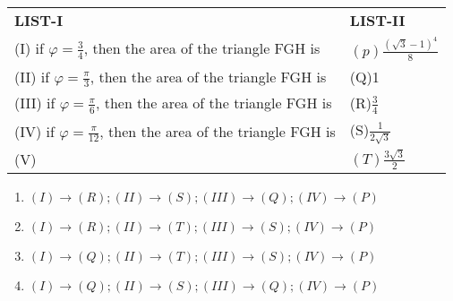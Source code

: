 \documentclass{article}
\begin{document}
\begin{enumerate}
\begin{center}                                        \begin{tabular}{l l}                                       \textbf{LIST-I} & \textbf{LIST-II} \\            (I) if $\varphi=\frac{3}{4}$, then the area of the triangle FGH is & $(p)\frac{(\sqrt{3}-1)^4}{8}$\\        (II) if $\varphi=\frac{\pi}{3}$, then the area of the triangle FGH is & (Q)1\\                              (III) if $\varphi =\frac{\pi}{6}$, then the area of the triangle FGH is & (R)$\frac{3}{4}$\\                (IV) if $\varphi =\frac{\pi}{12}$, then the area of the triangle FGH is & (S)$\frac{1}{2\sqrt{3}}$\\        (V)     & $(T)\frac{3\sqrt3}{2}$\\                    \end{tabular}                                         \end{center}                                                   
\begin{enumerate}[label=\Alph*.]	
\item $(I) \to (R);(II) \to (S);(III) \to (Q);(IV) \to (P)$    
\item $(I) \to (R);(II) \to (T);(III) \to (S);(IV) \to (P)$ 
\item $(I) \to (Q);(II) \to (T);(III) \to (S);(IV) \to (P)$    
\item $(I) \to (Q);(II) \to (S);(III) \to (Q);(IV) \to (P)$\\                                                         
\end{enumerate}

\end{enumerate}
\end{document}
